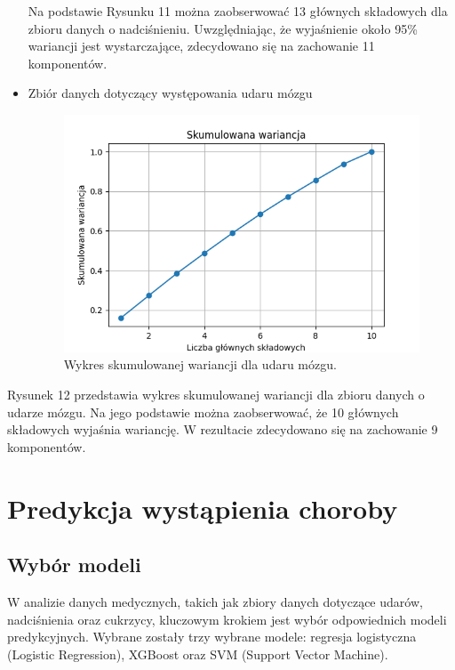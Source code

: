 \documentclass[onecolumn,12pt]{article}
\begin{document}
\begin{itemize}
Na podstawie Rysunku 11 można zaobserwować 13 głównych składowych dla zbioru danych o nadciśnieniu. Uwzględniając, że wyjaśnienie około 95\% wariancji jest wystarczające, zdecydowano się na zachowanie 11 komponentów.

\item{Zbiór danych dotyczący występowania udaru mózgu}
\begin{figure}[H]
    \centering
    \includegraphics[width=0.80\linewidth]{raport/graphs/skumulowana_wariancja_udar.png}
    \captionsetup{justification=centering}
    \caption{Wykres skumulowanej wariancji dla udaru mózgu.}
\end{figure}
\end{itemize}
Rysunek 12 przedstawia wykres skumulowanej wariancji dla zbioru danych o udarze mózgu. Na jego podstawie można zaobserwować, że 10 głównych składowych wyjaśnia wariancję. W rezultacie zdecydowano się na zachowanie 9 komponentów.

\section{Predykcja wystąpienia choroby}
\subsection{Wybór modeli}
\noindent
W analizie danych medycznych, takich jak zbiory danych dotyczące udarów, nadciśnienia oraz cukrzycy, kluczowym krokiem jest wybór odpowiednich modeli predykcyjnych. Wybrane zostały trzy wybrane modele: regresja logistyczna (Logistic Regression), XGBoost oraz SVM (Support Vector Machine). 
\end{document}

